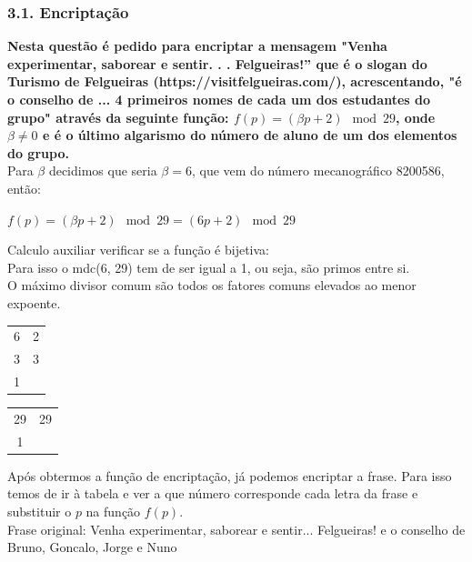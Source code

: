 \documentclass[12pt]{article}
\begin{document}
    \subsubsection{3.1. Encriptação }
    \noindent \textbf{Nesta questão é pedido para encriptar a mensagem "Venha experimentar, saborear e sentir. . . Felgueiras!” que é o slogan do Turismo de Felgueiras (https://visitfelgueiras.com/), acrescentando, "é o conselho de ... 4 primeiros nomes de cada um dos estudantes do grupo" através da seguinte função:  \(f(p) = (\beta p+ 2) \mod 29\), onde \(\beta \neq 0\) e é o último algarismo do número de aluno de um dos elementos do grupo.}\\
    
    \noindent Para \(\beta\) decidimos que seria \(\beta=6\), que vem do número mecanográfico 8200586, então:
    \begin{center}
    \(f(p) = (\beta p+ 2) \mod 29 = (6 p+ 2) \mod 29\)\\
    \end{center}
    
    \noindent Calculo auxiliar verificar se a função é bijetiva:\\
    \noindent Para isso o mdc(6, 29) tem de ser igual a 1, ou seja, são primos entre si.\\
    O máximo divisor comum são todos os fatores comuns elevados ao menor expoente.
    \begin{center}
    \begin{tabular}[hbt!]{c|c}
    6 & 2\\
    3 & 3\\
    1 & 
    \end{tabular} \hspace{1cm}
    \begin{tabular}[hbt!]{c|c}
    29 & 29\\
    1 &
    \end{tabular}
    \end{center}
    
    \noindent Após obtermos a função de encriptação, já podemos encriptar a frase. Para isso temos de ir à tabela e ver a que número corresponde cada letra da frase e substituir o \(p\) na função \(f(p)\).\\
    
     \noindent Frase original: Venha experimentar, saborear e sentir... Felgueiras! e o conselho de Bruno, Goncalo, Jorge e Nuno
     
\end{document}
